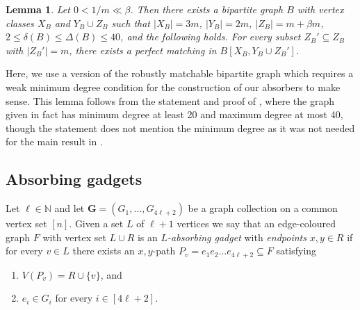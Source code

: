 \documentclass[11pt, dvipsnames]{amsart}
\theoremstyle{plain}
\newtheorem{lemma}[theo]{Lemma}
\theoremstyle{definition}
\newcommand{\mbf}[1]{\mathbf{#1}}
\newcommand{\dD}{\delta}
\newcommand{\pmo}[1]{\textcolor{magenta}{ $\blacktriangleright$\ {\sf PM: #1}\ 
  $\blacktriangleleft$ }}
\begin{document}
\begin{lemma}\label{lemma:rmbg}
Let $0 < 1/m \ll \beta$.
Then there exists a bipartite graph $B$ with vertex classes $X_B$ and $Y_B \cup Z_B$ such that $|X_B|=3m$, $|Y_B|=2m$, $|Z_B|=m+ \beta m$, $2 \leq \dD(B) \leq \Delta(B) \leq 40$, and the following holds. For every subset $Z_B'\subseteq Z_B$ with $|Z_B'|=m$, there exists a perfect matching in $B[X_B, Y_B \cup Z_B']$.
\end{lemma}

Here, we use a version of the robustly matchable bipartite graph which requires a weak minimum degree condition for the construction of our absorbers to make sense. This lemma follows from the statement and proof of \cite[Lemma 2.8]{mont2}, where the graph given in fact has minimum degree at least 20 and maximum degree at most 40, though the statement does not mention the minimum degree as it was not needed for the main result in \cite{mont2}. %

\subsection{Absorbing gadgets}

Let $\ell \in \mathbb{N}$ and let $\mbf G = (G_1,\ldots,G_{4\ell+2})$ be a graph collection on a common vertex set $[n]$. Given a set $L$ of $\ell+1$ vertices we say that an edge-coloured graph $F$ with vertex set $L\cup R$ is an \emph{$L$-absorbing gadget} with \emph{endpoints} $x,y\in R$ if for every $v\in L$ there exists an $x,y$-path $P_v=e_1e_2\ldots e_{4\ell+2}\subseteq F$ satisfying
\begin{enumerate}
\item $V(P_v) = R\cup \{v\}$, and
\item $e_i \in G_i$ for every $i \in [4\ell +2]$.
\end{enumerate}
\end{document}
